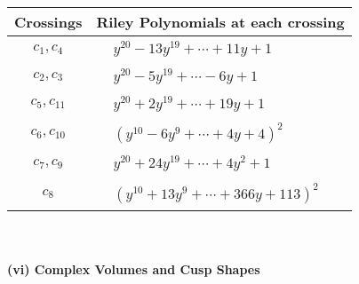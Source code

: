 \documentclass[1p]{elsarticle_modified}
\theoremstyle{definition}
\begin{document}
\begin{tabular}{m{50pt}|m{274pt}}
Crossings & \hspace{64pt}Riley Polynomials at each crossing \\
\hline $$\begin{aligned}c_{1},c_{4}\end{aligned}$$&$\begin{aligned}
&y^{20}-13 y^{19}+\cdots+11 y+1
\end{aligned}$\\
\hline $$\begin{aligned}c_{2},c_{3}\end{aligned}$$&$\begin{aligned}
&y^{20}-5 y^{19}+\cdots-6 y+1
\end{aligned}$\\
\hline $$\begin{aligned}c_{5},c_{11}\end{aligned}$$&$\begin{aligned}
&y^{20}+2 y^{19}+\cdots+19 y+1
\end{aligned}$\\
\hline $$\begin{aligned}c_{6},c_{10}\end{aligned}$$&$\begin{aligned}
&(y^{10}-6 y^9+\cdots+4 y+4)^{2}
\end{aligned}$\\
\hline $$\begin{aligned}c_{7},c_{9}\end{aligned}$$&$\begin{aligned}
&y^{20}+24 y^{19}+\cdots+4 y^2+1
\end{aligned}$\\
\hline $$\begin{aligned}c_{8}\end{aligned}$$&$\begin{aligned}
&(y^{10}+13 y^9+\cdots+366 y+113)^{2}
\end{aligned}$\\
\hline
\end{tabular}\\~\\
\newpage\flushleft \textbf{(vi) Complex Volumes and Cusp Shapes}
\end{document}
